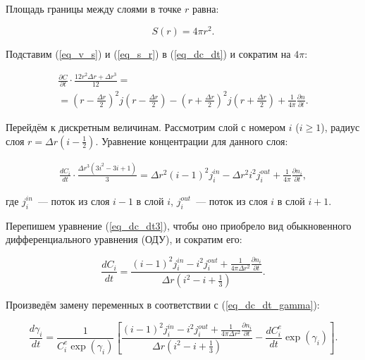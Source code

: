 \documentclass[12pt, a4paper]{article}
\begin{document}
Площадь границы между слоями в точке $r$ равна:

\begin{equation}
\label{eq_s_r}
S(r) = 4 \pi r^2.
\end{equation}

Подставим (\ref{eq_v_s}) и (\ref{eq_s_r}) в (\ref{eq_dc_dt}) и сократим на $4\pi$:

\begin{equation}
\label{eq_dc_dt2}
\begin{aligned}
\frac{\partial C}{\partial t}\cdot \frac{12 r^2 \Delta r + \Delta r^3}{12} = \\
= \left(r - \frac{\Delta r}{2} \right)^2 j \left(r - \frac{\Delta r}{2} \right) - \left(r + \frac{\Delta r}{2} \right) ^2 j \left(r + \frac{\Delta r}{2} \right) + \frac{1}{4\pi} \frac{\partial n}{\partial t}.
\end{aligned}
\end{equation}

Перейдём к дискретным величинам. Рассмотрим слой с номером $i$ ($i \ge 1$), радиус слоя $r = \Delta r \left( i - \frac{1}{2} \right)$. Уравнение концентрации для данного слоя:

\begin{equation}
\label{eq_dc_dt3}
\begin{aligned}
\frac{d C_i}{d t}\cdot \frac{\Delta r^3 \left( 3i^2 - 3i + 1 \right)}{3} = \Delta r^2 \left(i - 1 \right)^2 j_i^{in} - \Delta r^2 i^2 j_i^{out} + \frac{1}{4\pi} \frac{\partial n_i}{\partial t},
\end{aligned}
\end{equation}

\noindent где $j_i^{in}$~--- поток из слоя $i-1$ в слой $i$, $j_i^{out}$~--- поток из слоя $i$ в слой $i+1$.

Перепишем уравнение (\ref{eq_dc_dt3}), чтобы оно приобрело вид обыкновенного дифференциального уравнения (ОДУ), и сократим его:

\begin{equation}
\frac{d C_i}{d t} = \frac{ \left(i - 1 \right)^2 j_i^{in} - i^2 j_i^{out} + \frac{1}{4 \pi \Delta r^2} \frac{\partial n_i}{\partial t} } { \Delta r \left( i^2 - i + \frac{1}{3} \right) }.
\end{equation}

Произведём замену переменных в соответствии с (\ref{eq_dc_dt_gamma}):

\begin{equation}
\frac{d \gamma_i}{d t} = \frac{1}{C^e_i \exp(\gamma_i)} \left[ \frac{ \left(i - 1 \right)^2 j_i^{in} - i^2 j_i^{out} + \frac{1}{4 \pi \Delta r^2} \frac{\partial n_i}{\partial t} } { \Delta r \left( i^2 - i + \frac{1}{3} \right) } - \frac{dC^e_i}{dt} \exp(\gamma_i) \right].
\end{equation}
\end{document}
